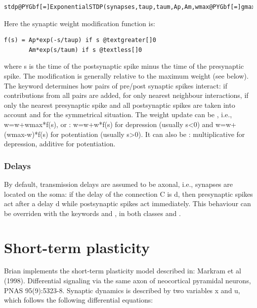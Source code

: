 \documentclass[letterpaper,10pt,english]{manual}
\begin{document}
\begin{Verbatim}[commandchars=@\[\]]
stdp@PYGbf[=]ExponentialSTDP(synapses,taup,taum,Ap,Am,wmax@PYGbf[=]gmax,interactions@PYGbf[=]@PYGad[']@PYGad[all]@PYGad['],update@PYGbf[=]@PYGad[']@PYGad[additive]@PYGad['])
\end{Verbatim}

Here the synaptic weight modification function is:

\begin{Verbatim}[commandchars=@\[\]]
f(s) = Ap*exp(-s/taup) if s @textgreater[]0
       Am*exp(s/taum) if s @textless[]0
\end{Verbatim}

where s is the time of the postsynaptic spike minus the time of the presynaptic spike.
The modification is generally relative to the maximum weight  (see below).
The  keyword determines
how pairs of pre/post synaptic spikes interact:  if contributions from
all pairs are added,  for only nearest neighbour interactions,
 if only the nearest presynaptic spike and all postsynaptic
spikes are taken into account and  for the symmetrical situation.
The weight update can be , i.e., w=w+wmax*f(s), or :
w=w+w*f(s) for depression (usually s\textless{}0) and w=w+(wmax-w)*f(s) for potentiation
(usually s\textgreater{}0). It can also be : multiplicative for depression, additive for
potentiation.


\subsubsection{Delays}

By default, transmission delays are assumed to be axonal, i.e., synapses are located
on the soma: if the delay of the connection C is d, then presynaptic spikes act after
a delay d while postsynaptic spikes act immediately. This behaviour can be overriden with
the keywords  and , in both classes  and
.

\resetcurrentobjects
\hypertarget{--doc-stp}{}

\section{Short-term plasticity}

Brian implements the short-term plasticity model described in:
Markram et al (1998). Differential signaling via the same axon of neocortical
pyramidal neurons, PNAS 95(9):5323-8.
Synaptic dynamics is described by two variables x and u, which
follows the following differential equations:
\end{document}
